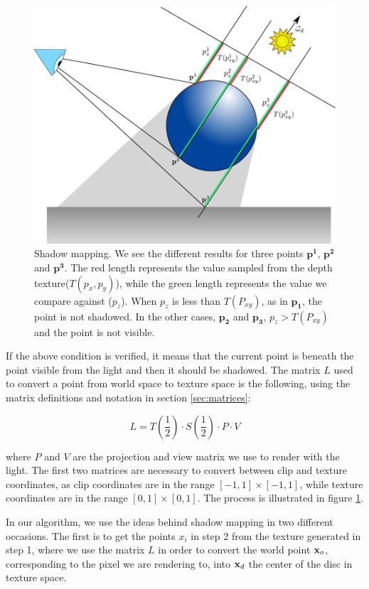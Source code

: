 \begin{figure}[!ht]
\centering
\includegraphics[width=\linewidth]{images/method/shadow_map.pdf}
\caption{Shadow mapping. We see the different results for three points $\mathbf{p^1}$, $\mathbf{p^2}$ and $\mathbf{p^3}$. The red length represents the value sampled from the depth texture($T(p_x,p_y)$), while the green length represents the value we compare against ($p_z$). When $p_z$ is less than $T(P_{xy})$, as in $\mathbf{p_1}$, the point is not shadowed. In the other cases, $\mathbf{p_2}$ and $\mathbf{p_3}$, $p_z > T(P_{xy})$and the point is not visible.}
\label{fig:shadow_map}
\end{figure} 

If the above condition is verified, it means that the current point is beneath the point visible from the light and then it should be shadowed. The matrix $L$ used to convert a point from world space to texture space is the following, using the matrix definitions and notation in section \ref{sec:matrices}:

$$
L = T\left(\frac{1}{2}\right) \cdot S\left(\frac{1}{2}\right) \cdot P \cdot V
$$

where $P$ and $V$ are the projection and view matrix we use to render with the light. The first two matrices are necessary to convert between clip and texture coordinates, as clip coordinates are in the range $[-1,1] \times [-1,1]$, while texture coordinates are in the range $[0,1]\times[0,1]$. The process is illustrated in figure \ref{fig:shadow_map}.

In our algorithm, we use the ideas behind shadow mapping in two different occasions. The first is to get the points $x_i$ in step 2 from the texture generated in step 1, where we use the matrix $L$ in order to convert the world point $\mathbf{x}_o$, corresponding to the pixel we are rendering to, into $\mathbf{x}_d$ the center of the disc in texture space. 

